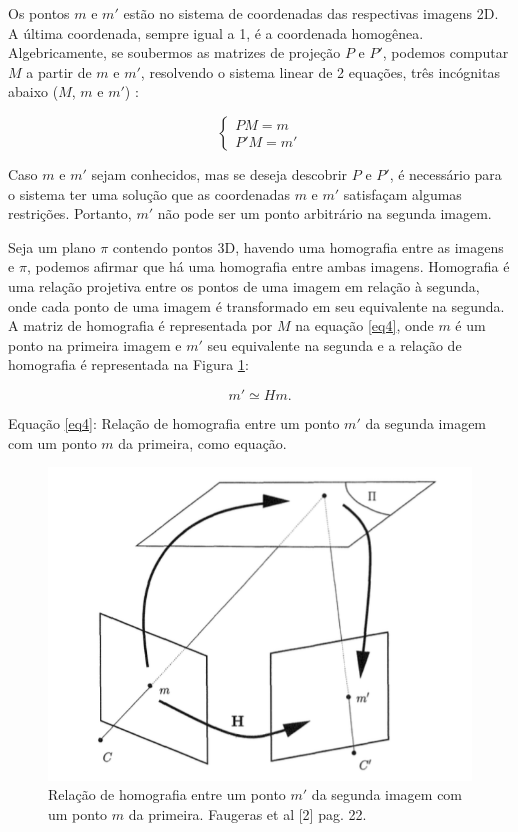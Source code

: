 Os pontos $m$ e $m'$ estão no sistema de coordenadas das respectivas imagens 2D. A última coordenada, sempre igual a 1, é a coordenada homogênea.
Algebricamente, se soubermos as matrizes de projeção $P$ e $P'$, podemos computar $M$ a partir de $m$ e $m'$, resolvendo o sistema linear de 2 equações, três incógnitas abaixo ($M$, $m$ e $m'$) \cite{Faugeras-Geometry}:

\begin{equation}\label{eq3}
\begin{cases}
	PM = m \\
	P'M = m'
\end{cases}
\end{equation}

Caso $m$ e $m'$ sejam conhecidos, mas se deseja descobrir $P$ e $P'$, é necessário para o sistema ter uma solução que as coordenadas $m$ e $m'$ satisfaçam algumas restrições. Portanto, $m'$ não pode ser um ponto arbitrário na segunda imagem.

Seja um plano $\pi$ contendo pontos 3D, havendo uma homografia entre as imagens e $\pi$, podemos afirmar que há uma homografia entre ambas imagens. Homografia é uma relação projetiva entre os pontos de uma imagem em relação à segunda, onde cada ponto de uma imagem é transformado em seu equivalente na segunda. A matriz de homografia é representada por $M$ na equação \eqref{eq4}, onde $m$ é um ponto na primeira imagem e $m'$ seu equivalente na segunda e a relação de homografia é representada na Figura \ref{fig1}:

\begin{equation}\label{eq4}
m' \simeq Hm.
\end{equation}

Equação \eqref{eq4}: Relação de homografia entre um ponto $m'$ da segunda imagem com um ponto $m$ da primeira, como equação.

\begin{figure}[H]
	\centering
		\includegraphics{Imagens/figura2-1.png}
	\caption{Relação de homografia entre um ponto $m'$ da segunda imagem com um ponto $m$ da primeira. Faugeras et al [2] pag. 22.}
	\label{fig1}
\end{figure}

